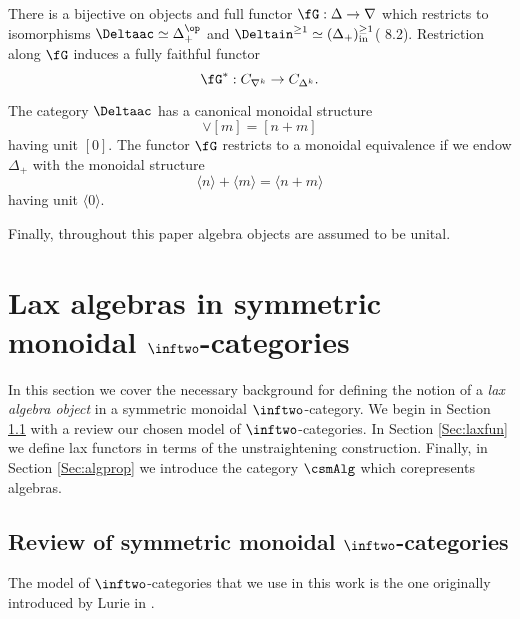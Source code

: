 \documentclass[a4paper]{article}
\numberwithin{equation}{section}
\begin{document}
 
 There is a bijective on objects and full functor $\fG: \Delta \to \nabla$ which restricts to isomorphisms $\Deltaac \simeq \Delta_+^\op$ and $\Deltain^{\geq 1} \simeq (\Delta_+)_\mathrm{in}^{\geq 1}$(\cite{Kockres} 8.2). Restriction along $\fG$ induces a fully faithful functor
 \begin{equation}
  \label{Augdef}
  \fG^*: C_{\nabla^k} \to C_{\Delta^k}.
 \end{equation}


 The category $\Deltaac$ has a canonical monoidal structure 
 \begin{equation*}
 [n] \vee [m] = [n+m]
\end{equation*}
having unit $[0]$. The functor $\fG$ restricts to a monoidal equivalence if we endow $\Delta_+$ with the monoidal structure
\begin{equation}
\label{AugMon}
 \langle n \rangle + \langle m \rangle = \langle n+m \rangle
\end{equation}
having unit $\langle 0 \rangle$. 

Finally, throughout this paper algebra objects are assumed to be unital.



\section{Lax algebras in symmetric monoidal \texorpdfstring{$\inftwo$}{(oo,2)}-categories }
\label{Sec:LaxAlg}
In this section we cover the necessary background for defining the notion of a {\em lax algebra object} in a symmetric monoidal $\inftwo$-category. We begin in Section \ref{Sec:inftwo} with a review our chosen model of $\inftwo$-categories. In Section \ref{Sec:laxfun} we define lax functors in terms of the unstraightening construction. Finally, in Section \ref{Sec:algprop} we introduce the category $\csmAlg$ which corepresents algebras.



\subsection{Review of symmetric monoidal \texorpdfstring{$\inftwo$}{(oo,2)}-categories}
\label{Sec:inftwo}
The model of $\inftwo$-categories that we use in this work is the one originally introduced by Lurie in \cite{Lurieinftwo}. 
\end{document}
